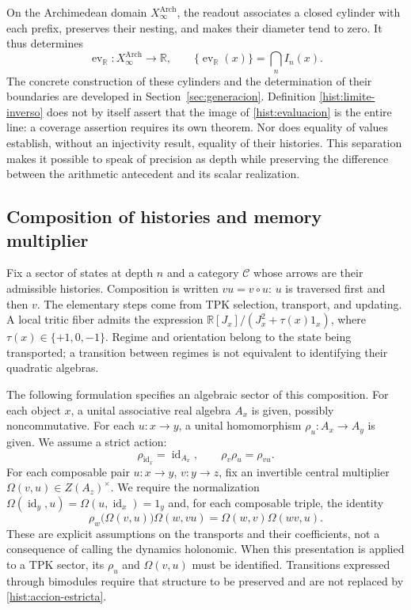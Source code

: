 On the Archimedean domain \(X_\infty^{\mathrm{Arch}}\), the readout associates
a closed cylinder with each prefix, preserves their nesting, and makes
their diameter tend to zero. It thus determines
\begin{equation}
 \operatorname{ev}_{\mathbb R}:X_\infty^{\mathrm{Arch}}\longrightarrow
 \mathbb R,\qquad
 \{\operatorname{ev}_{\mathbb R}(x)\}=\bigcap_n I_n(x).
 \label{hist:evaluacion}
\end{equation}
The concrete construction of these cylinders and the determination of their boundaries
are developed in Section~\ref{sec:generacion}. Definition
\eqref{hist:limite-inverso} does not by itself assert that the image of
\eqref{hist:evaluacion} is the entire line: a coverage assertion
requires its own theorem. Nor does equality of values establish, without
an injectivity result, equality of their histories. This separation
makes it possible to speak of precision as depth while preserving the difference
between the arithmetic antecedent and its scalar realization.

\subsection{Composition of histories and memory multiplier}
\label{hist:algebra}

Fix a sector of states at depth \(n\) and a category
\(\mathcal C\) whose arrows are their admissible histories. Composition
is written \(vu=v\circ u\): \(u\) is traversed first and then \(v\).
The elementary steps come from TPK selection, transport, and
updating. A local tritic fiber admits the expression
\(\mathbb R[J_x]/(J_x^2+\tau(x)1_x)\), where
\(\tau(x)\in\{+1,0,-1\}\). Regime and orientation belong to the
state being transported; a transition between regimes is not equivalent to
identifying their quadratic algebras.

The following formulation specifies an algebraic sector of this composition.
For each object \(x\), a unital associative real algebra \(A_x\) is given,
possibly noncommutative. For each \(u:x\to y\), a
unital homomorphism \(\rho_u:A_x\to A_y\) is given. We assume a strict action:
\begin{equation}
 \rho_{\operatorname{id}_x}=\operatorname{id}_{A_x},\qquad
 \rho_v\rho_u=\rho_{vu}.
 \label{hist:accion-estricta}
\end{equation}
For each composable pair \(u:x\to y\), \(v:y\to z\), fix an
invertible central multiplier
\(\Omega(v,u)\in Z(A_z)^\times\). We require the normalization
\(\Omega(\operatorname{id}_y,u)=\Omega(u,\operatorname{id}_x)=1_y\)
and, for each composable triple, the identity
\begin{equation}
 \rho_w\bigl(\Omega(v,u)\bigr)\Omega(w,vu)
   =\Omega(w,v)\Omega(wv,u).
 \label{hist:cociclo}
\end{equation}
These are explicit assumptions on the transports and their coefficients, not a
consequence of calling the dynamics holonomic. When this presentation is applied
to a TPK sector, its \(\rho_u\) and \(\Omega(v,u)\) must be identified.
Transitions expressed through bimodules require that structure to be
preserved and are not replaced by \eqref{hist:accion-estricta}.

